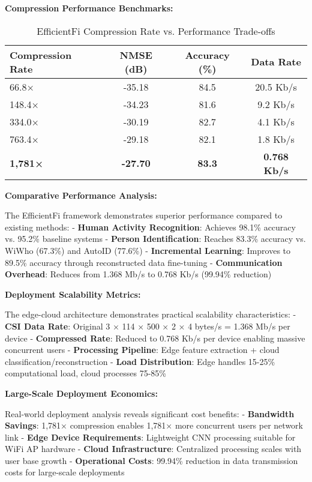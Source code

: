 \documentclass[journal]{IEEEtran}
\begin{document}
{\textbf{Compression Performance Benchmarks:}

\begin{table}[h]
\centering
\begin{tabular}{|l|c|c|c|}
\hline
\textbf{Compression Rate} & \textbf{NMSE (dB)} & \textbf{Accuracy (\%)} & \textbf{Data Rate} \\
\hline
66.8× & -35.18 & 84.5 & 20.5 Kb/s \\
148.4× & -34.23 & 81.6 & 9.2 Kb/s \\
334.0× & -30.19 & 82.7 & 4.1 Kb/s \\
763.4× & -29.18 & 82.1 & 1.8 Kb/s \\
\textbf{1,781×} & \textbf{-27.70} & \textbf{83.3} & \textbf{0.768 Kb/s} \\
\hline
\end{tabular}
\caption{EfficientFi Compression Rate vs. Performance Trade-offs}
\label{tab:efficientfi_compression}
\end{table}

\textbf{Comparative Performance Analysis:}

The EfficientFi framework demonstrates superior performance compared to existing methods:
- \textbf{Human Activity Recognition}: Achieves 98.1\% accuracy vs. 95.2\% baseline systems
- \textbf{Person Identification}: Reaches 83.3\% accuracy vs. WiWho (67.3\%) and AutoID (77.6\%)
- \textbf{Incremental Learning}: Improves to 89.5\% accuracy through reconstructed data fine-tuning
- \textbf{Communication Overhead}: Reduces from 1.368 Mb/s to 0.768 Kb/s (99.94\% reduction)

\textbf{Deployment Scalability Metrics:}

The edge-cloud architecture demonstrates practical scalability characteristics:
- \textbf{CSI Data Rate}: Original 3 × 114 × 500 × 2 × 4 bytes/s = 1.368 Mb/s per device
- \textbf{Compressed Rate}: Reduced to 0.768 Kb/s per device enabling massive concurrent users
- \textbf{Processing Pipeline}: Edge feature extraction + cloud classification/reconstruction
- \textbf{Load Distribution}: Edge handles 15-25\% computational load, cloud processes 75-85\%

\textbf{Large-Scale Deployment Economics:}

Real-world deployment analysis reveals significant cost benefits:
- \textbf{Bandwidth Savings}: 1,781× compression enables 1,781× more concurrent users per network link
- \textbf{Edge Device Requirements}: Lightweight CNN processing suitable for WiFi AP hardware
- \textbf{Cloud Infrastructure}: Centralized processing scales with user base growth
- \textbf{Operational Costs}: 99.94\% reduction in data transmission costs for large-scale deployments

}
\end{document}
